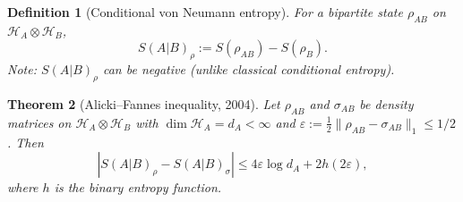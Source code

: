 \documentclass[12pt,a4paper]{article}
\newtheorem{theorem}{Theorem}[section]
\newtheorem{definition}[theorem]{Definition}
\newcommand{\HS}{\mathcal{H}}
\begin{document}
\begin{definition}[Conditional von Neumann entropy]
For a bipartite state $\rho_{AB}$ on $\HS_A\otimes\HS_B$,
\[
  S(A|B)_\rho := S(\rho_{AB}) - S(\rho_B).
\]
Note: $S(A|B)_\rho$ can be \emph{negative} (unlike classical conditional
entropy).
\end{definition}

\begin{theorem}[Alicki--Fannes inequality, 2004]\label{thm:AF2004}
Let $\rho_{AB}$ and $\sigma_{AB}$ be density matrices on
$\HS_A\otimes\HS_B$ with $\dim\HS_A=d_A<\infty$ and
$\varepsilon:=\frac{1}{2}\|\rho_{AB}-\sigma_{AB}\|_1\leq 1/2$.  Then
\begin{equation}\label{eq:AF2004}
  \left|S(A|B)_\rho - S(A|B)_\sigma\right|
  \leq 4\varepsilon\log d_A + 2h(2\varepsilon),
\end{equation}
where $h$ is the binary entropy function.
\end{theorem}
\end{document}

